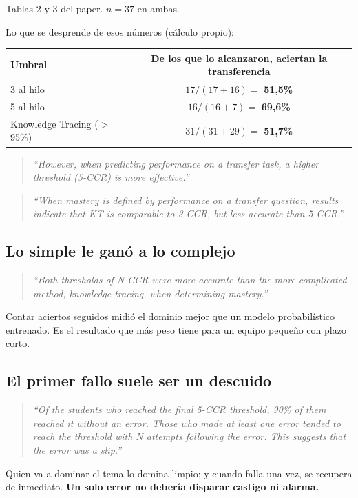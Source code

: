\documentclass[11pt,a4paper]{article}
\newcommand{\cita}[1]{\begin{quote}\itshape\small #1\end{quote}}
\begin{document}
\vspace{4pt}
{\small Tablas 2 y 3 del paper. $n = 37$ en ambas.}

\vspace{6pt}
Lo que se desprende de esos números (cálculo propio):

\begin{center}
\begin{tabular}{lc}
\toprule
\textbf{Umbral} & \textbf{De los que lo alcanzaron, aciertan la transferencia} \\
\midrule
3 al hilo & $17/(17{+}16) = $ \textbf{51{,}5\%} \\
5 al hilo & $16/(16{+}7) = $ \textbf{69{,}6\%} \\
Knowledge Tracing ($>$95\%) & $31/(31{+}29) = $ \textbf{51{,}7\%} \\
\bottomrule
\end{tabular}
\end{center}

\cita{``However, when predicting performance on a transfer task, a higher threshold (5-CCR) is more effective.''}

\cita{``When mastery is defined by performance on a transfer question, results indicate that KT is comparable to 3-CCR, but less accurate than 5-CCR.''}

\subsection{Lo simple le ganó a lo complejo}

\cita{``Both thresholds of N-CCR were more accurate than the more complicated method, knowledge tracing, when determining mastery.''}

Contar aciertos seguidos midió el dominio mejor que un modelo probabilístico entrenado. Es el resultado que más peso tiene para un equipo pequeño con plazo corto.

\subsection{El primer fallo suele ser un descuido}

\cita{``Of the students who reached the final 5-CCR threshold, 90\% of them reached it without an error. Those who made at least one error tended to reach the threshold with N attempts following the error. This suggests that the error was a slip.''}

Quien va a dominar el tema lo domina limpio; y cuando falla una vez, se recupera de inmediato. \textbf{Un solo error no debería disparar castigo ni alarma.}
\end{document}
